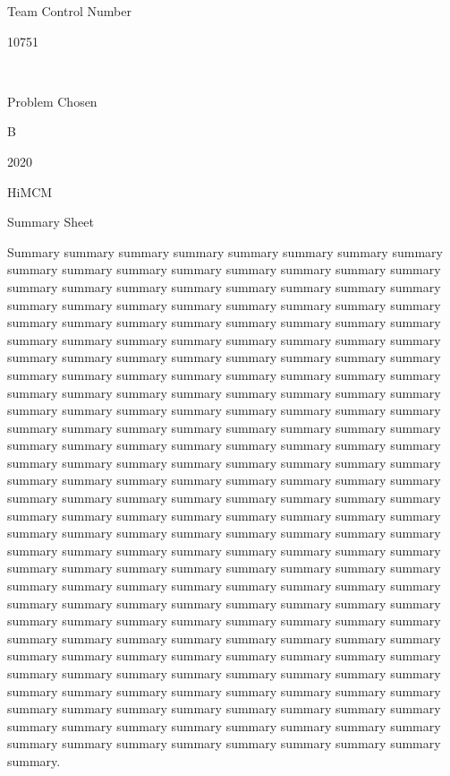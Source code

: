 \documentclass{article}
\begin{document}
\begin{center}
Team Control Number

\Huge 10751

\normalsize ~

Problem Chosen

\Huge B

\Large 2020

HiMCM

Summary Sheet
\end{center}

\normalsize

 Summary summary summary summary summary summary summary summary summary summary summary summary summary summary summary summary summary summary summary summary summary summary summary summary summary summary summary summary summary summary summary summary summary summary summary summary summary summary summary summary summary summary summary summary summary summary summary summary summary summary summary summary summary summary summary summary summary summary summary summary summary summary summary summary summary summary summary summary summary summary summary summary summary summary summary summary summary summary summary summary summary summary summary summary summary summary summary summary summary summary summary summary summary summary summary summary summary summary summary summary summary summary summary summary summary summary summary summary summary summary summary summary summary summary summary summary summary summary summary summary summary summary summary summary summary summary summary summary summary summary summary summary summary summary summary summary summary summary summary summary summary summary summary summary summary summary summary summary summary summary summary summary summary summary summary summary summary summary summary summary summary summary summary summary summary summary summary summary summary summary summary summary summary summary summary summary summary summary summary summary summary summary summary summary summary summary summary summary summary summary summary summary summary summary summary summary summary summary summary summary summary summary summary summary summary summary summary summary summary summary summary summary summary summary summary summary summary summary summary summary summary summary summary summary summary summary summary summary summary summary summary summary summary.

\newpage

\tableofcontents
\end{document}
